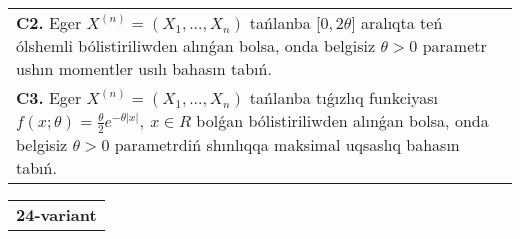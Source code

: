 \documentclass{article}
\begin{document}
\begin{tabular}{m{17cm}}
 \\
\textbf{C2.} 
Eger \(X^{(n)} = \left( X_{1},...,X_{n} \right)\) tańlanba {[}\(0,2\theta\rbrack\) aralıqta teń ólshemli bólistiriliwden alınǵan bolsa, onda belgisiz \(\theta > 0\) parametr ushın momentler usılı bahasın tabıń.
 \\
\textbf{C3.} 
Eger \(X^{(n)} = \left( X_{1},...,X_{n} \right)\) tańlanba tıǵızlıq funkciyası
$f(x;\theta) = \frac{\theta}{2}e^{- \theta|x|},\ x \in R$
bolǵan bólistiriliwden alınǵan bolsa, onda belgisiz \(\theta > 0\) parametrdiń shınlıqqa maksimal uqsaslıq bahasın tabıń.
 \\

\end{tabular}
\vspace{1cm}


\begin{tabular}{m{17cm}}
\textbf{24-variant}
\newline


\end{tabular}
\end{document}

